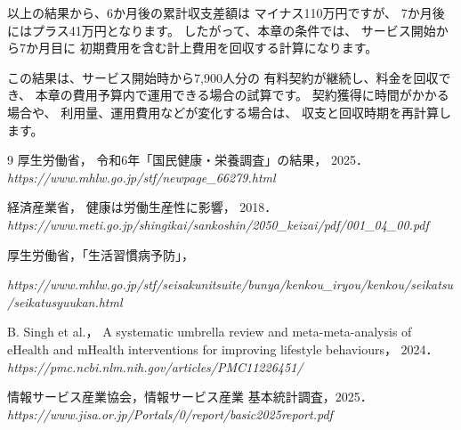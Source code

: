 \documentclass[uplatex,dvipdfmx]{jlreq}
\begin{document}
以上の結果から、6か月後の累計収支差額は
マイナス110万円ですが、
7か月後にはプラス41万円となります。
したがって、本章の条件では、
サービス開始から7か月目に
初期費用を含む計上費用を回収する計算になります。

この結果は、サービス開始時から7,900人分の
有料契約が継続し、料金を回収でき、
本章の費用予算内で運用できる場合の試算です。
契約獲得に時間がかかる場合や、
利用量、運用費用などが変化する場合は、
収支と回収時期を再計算します。



\begin{thebibliography}{9}
厚生労働省，
令和6年「国民健康・栄養調査」の結果，
2025．
\textit{https://www.mhlw.go.jp/stf/newpage\_66279.html}

    経済産業省，
    健康は労働生産性に影響，
    2018．
    \textit{https://www.meti.go.jp/shingikai/sankoshin/2050\_keizai/pdf/001\_04\_00.pdf}

厚生労働省，「生活習慣病予防」，

\textit{https://www.mhlw.go.jp/stf/seisakunitsuite/bunya/kenkou\_iryou/kenkou/seikatsu/seikatusyuukan.html}

B. Singh et al.，
A systematic umbrella review and meta-meta-analysis of eHealth and mHealth interventions for improving lifestyle behaviours，
2024．
\textit{https://pmc.ncbi.nlm.nih.gov/articles/PMC11226451/}


情報サービス産業協会，情報サービス産業 基本統計調査，2025．
\textit{https://www.jisa.or.jp/Portals/0/report/basic2025report.pdf}
\end{thebibliography}
\end{document}
